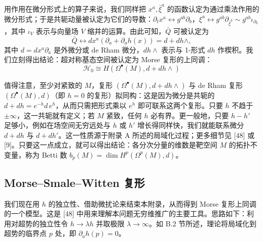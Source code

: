 用作用在微分形式上的算子来说，我们同样把 $x^a,\bar\xi^a$ 的函数认定为通过乘法作用的微分形式；于是共轭动量被认定为它们的导数：$\partial_t x^a\leftrightarrow g^{ab}\partial_b$，$\xi^a\leftrightarrow g^{ab}\partial_{\bar\xi^b}\sim g^{ab}\iota_{\partial_b}$，其中 $\iota_V$ 表示与向量场 $V$ 缩并的运算。由此可知，$\bar Q$ 可被认定为
\begin{equation}
  \tag{B.23}
  \bar Q\leftrightarrow dx^a(\partial_a+\partial_a h(x))=d+dh\wedge,
\end{equation}
其中 $d=dx^a\partial_a$ 是外微分或 de Rham 微分，$dh\wedge$ 表示与 1-形式 $dh$ 作楔积。我们立刻得出结论：超对称基态空间被认定为 Morse 复形的上同调：
\begin{equation}
  \tag{B.24}
  \mathcal{H}_0\cong H(\Omega^\bullet(M),d+dh\wedge)
\end{equation}

值得注意，至少对紧致的 $M$，复形 $(\Omega^\bullet(M),d+dh\wedge)$ 与 de Rham 复形 $(\Omega^\bullet(M),d)$（即 $h=0$ 的复形）拟同构：这是因为微分是共轭的 $d+dh=e^{-h}d\,e^{h}$，从而只需把形式乘以 $e^{h}$ 即可联系这两个复形。只要 $h$ 不趋于 $\pm\infty$，这一共轭就有定义；若 $M$ 紧致，任何 $h$ 必有界。更一般地，只要 $h-h'$ 足够小，例如在场空间无穷远处与 $h$ 或 $h'$ 增长得同样快，我们就能联系微分 $d+dh$ 与 $d+dh'$。这一性质源于附录 A 所述的局域化过程；更多细节见 [48] 或 [9]。只要这一点成立，就可以得出结论：各分次分量的维数是靶空间 $M$ 的拓扑不变量，称为 Betti 数 $b_p(M)=\dim H^p(\Omega^p(M),d)$。

\subsection{Morse–Smale–Witten 复形}
我们现在用 $h$ 的独立性、借助微扰论来结束本附录，从而得到 Morse 复形上同调的一个模型。这是 [48] 中用来理解本问题无穷维推广的主要工具。思路如下：利用对超势的独立性令 $h\to\lambda h$ 并取极限 $\lambda\to\infty$。如 B.2 节所述，理论将局域化到超势的临界点 $p$ 处，即 $\partial_a h(p)=0$。


